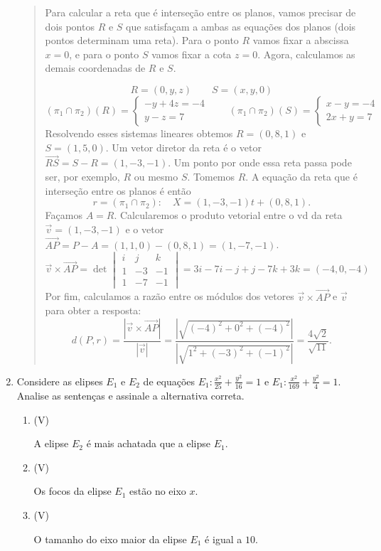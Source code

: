 \documentclass[12pt,a4paper]{article}
\newenvironment{ans}{\color{blue}\begin{quote}}{\end{quote}}
\newif \ifans
\newif \ifvf
\newcommand{\alt}{
	\ifvf
		\ifans
			\item({\sf\color{ForestGreen}V})
		\else 
			\item({\sf\color{Orange}F}) 
		\fi
	\else
		\ifans
			\item({\sf\color{Cyan}X})
		\else 
			\item({\sf\phantom{X}}) 
		\fi	
	\fi	
	\ansfalse
	\vffalse
}
\def\V{\vftrue\anstrue}
\begin{document}
\begin{enumerate}
	\begin{ans}
	Para calcular a reta que é interseção entre os planos, vamos precisar de dois pontos $R$ e $S$ que satisfaçam a ambas as equações dos planos (dois pontos determinam uma reta). Para o ponto $R$ vamos fixar a abscissa $x=0$, e para o ponto $S$ vamos fixar a cota $z=0$. Agora, calculamos as demais coordenadas de $R$ e $S$. 
	
	\[
	R=(0,y,z) \qquad S=(x,y,0)
	\]
	\[
	(\pi_1\cap\pi_2)(R)=
	\begin{cases}
		-y+4z=-4\\
		y-z=7	
	\end{cases}
	\qquad
	(\pi_1\cap\pi_2)(S)=
	\begin{cases}
		x-y=-4\\
		2x+y=7	
	\end{cases}
	\]
	Resolvendo esses sistemas lineares obtemos $R=(0,8,1)$ e $S=(1,5,0)$.
	Um vetor diretor da reta é o vetor $\overrightarrow{RS}=S-R=(1,-3,-1)$. Um ponto por onde essa reta passa pode ser, por exemplo, $R$ ou mesmo $S$. Tomemos $R$. A equação da reta que é interseção entre os planos é então
	\[
		r=(\pi_1\cap\pi_2):\quad X=(1,-3,-1)t+(0,8,1).
	\]
	Façamos $A=R$. Calcularemos o produto vetorial entre o vd da reta $\vec v=(1,-3,-1)$ e o vetor $\overrightarrow{AP}=P-A=(1,1,0)-(0,8,1)=(1,-7,-1)$.
	\[
	\vec v\times \overrightarrow{AP}=
	\det
	\begin{vmatrix}
	i & j & k\\
	1 & -3 & -1\\
	1 & -7 & -1
	\end{vmatrix}
	=3i-7i-j+j-7k+3k=(-4,0,-4)
	\]
	Por fim, calculamos a razão entre os módulos dos vetores $\vec v\times \overrightarrow{AP}$ e $\vec v$ para obter a resposta:
	\[
	d(P,r)=\frac{|\vec v\times\overrightarrow{AP}|}{|\vec v|}=\frac{|\sqrt{(-4)^2+0^2+(-4)^2}|}{|\sqrt{1^2+(-3)^2+(-1)^2}|}=\frac{4\sqrt{2}}{\sqrt{11}}.
	\]
	\end{ans}
	




\item Considere as elipses $E_1$ e $E_2$ de equações $E_1: \frac{x^2}{25}+\frac{y^2}{16}=1$ e $E_1: \frac{x^2}{169}+\frac{y^2}{4}=1$. Analise as sentenças e assinale a alternativa correta.

	\begin{enumerate}[label=\Roman*.]
	\V\alt A elipse $E_2$ é mais achatada que a elipse $E_1$.
	\V\alt Os focos da elipse $E_1$ estão no eixo $x$.
	\V\alt O tamanho do eixo maior da elipse $E_1$ é igual a $10$.
	\end{enumerate}
	

\end{enumerate}
\end{document}
